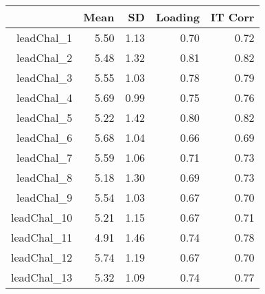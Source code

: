 \begin{table}[ht]
\centering
\begin{tabular}{rrrrr}
  \hline
 & Mean & SD & Loading & IT Corr \\ 
  \hline
leadChal\_1 & 5.50 & 1.13 & 0.70 & 0.72 \\ 
  leadChal\_2 & 5.48 & 1.32 & 0.81 & 0.82 \\ 
  leadChal\_3 & 5.55 & 1.03 & 0.78 & 0.79 \\ 
  leadChal\_4 & 5.69 & 0.99 & 0.75 & 0.76 \\ 
  leadChal\_5 & 5.22 & 1.42 & 0.80 & 0.82 \\ 
  leadChal\_6 & 5.68 & 1.04 & 0.66 & 0.69 \\ 
  leadChal\_7 & 5.59 & 1.06 & 0.71 & 0.73 \\ 
  leadChal\_8 & 5.18 & 1.30 & 0.69 & 0.73 \\ 
  leadChal\_9 & 5.54 & 1.03 & 0.67 & 0.70 \\ 
  leadChal\_10 & 5.21 & 1.15 & 0.67 & 0.71 \\ 
  leadChal\_11 & 4.91 & 1.46 & 0.74 & 0.78 \\ 
  leadChal\_12 & 5.74 & 1.19 & 0.67 & 0.70 \\ 
  leadChal\_13 & 5.32 & 1.09 & 0.74 & 0.77 \\ 
   \hline
\end{tabular}
\end{table}
